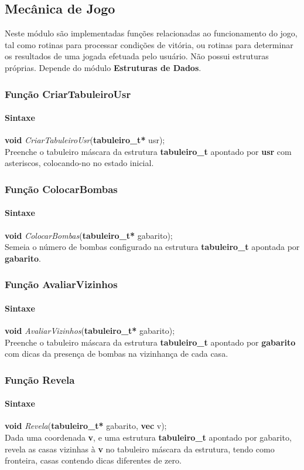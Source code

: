 \documentclass[10pt,a4paper]{report}
\begin{document}
\subsection{Mecânica de Jogo}
Neste módulo são implementadas funções relacionadas ao funcionamento do jogo, tal como rotinas para processar condições de vitória, ou rotinas para determinar os resultados de uma jogada efetuada pelo usuário. Não possui estruturas próprias. Depende do módulo \textbf{Estruturas de Dados}.
\subsubsection{Função CriarTabuleiroUsr}
\paragraph{Sintaxe}
\textbf{void} {\it CriarTabuleiroUsr}(\textbf{tabuleiro\_t*} usr);\\
Preenche o tabuleiro máscara da estrutura \textbf{tabuleiro\_t} apontado por \textbf{usr} com asteriscos, colocando-no no estado inicial.
\subsubsection{Função ColocarBombas}
\paragraph{Sintaxe}
\textbf{void} {\it ColocarBombas}(\textbf{tabuleiro\_t*} gabarito);\\
Semeia o número de bombas configurado na estrutura \textbf{tabuleiro\_t} apontada por \textbf{gabarito}.
\subsubsection{Função AvaliarVizinhos}
\paragraph{Sintaxe}
\textbf{void} {\it AvaliarVizinhos}(\textbf{tabuleiro\_t*} gabarito);\\
Preenche o tabuleiro máscara da estrutura \textbf{tabuleiro\_t} apontado por \textbf{gabarito} com dicas da presença de bombas na vizinhança de cada casa.
\subsubsection{Função Revela}
\paragraph{Sintaxe}
\textbf{void} {\it Revela}(\textbf{tabuleiro\_t*} gabarito, \textbf{vec} v);\\
Dada uma coordenada \textbf{v}, e uma estrutura \textbf{tabuleiro\_t} apontado por gabarito, revela as casas vizinhas à \textbf{v} no tabuleiro máscara da estrutura, tendo como fronteira, casas contendo dicas diferentes de zero.
\end{document}

